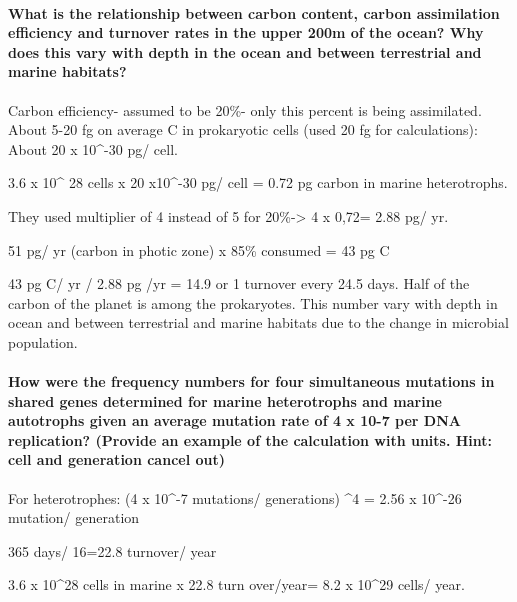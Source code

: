 \documentclass[]{article}
\let\oldparagraph\paragraph
\renewcommand{\paragraph}[1]{\oldparagraph{#1}\mbox{}}
\begin{document}
\paragraph{What is the relationship between carbon content, carbon
assimilation efficiency and turnover rates in the upper 200m of the
ocean? Why does this vary with depth in the ocean and between
terrestrial and marine
habitats?}\label{what-is-the-relationship-between-carbon-content-carbon-assimilation-efficiency-and-turnover-rates-in-the-upper-200m-of-the-ocean-why-does-this-vary-with-depth-in-the-ocean-and-between-terrestrial-and-marine-habitats}

Carbon efficiency- assumed to be 20\%- only this percent is being
assimilated. About 5-20 fg on average C in prokaryotic cells (used 20 fg
for calculations): About 20 x 10\^{}-30 pg/ cell.

3.6 x 10\^{} 28 cells x 20 x10\^{}-30 pg/ cell = 0.72 pg carbon in
marine heterotrophs.

They used multiplier of 4 instead of 5 for 20\%-\textgreater{} 4 x 0,72=
2.88 pg/ yr.

51 pg/ yr (carbon in photic zone) x 85\% consumed = 43 pg C

43 pg C/ yr / 2.88 pg /yr = 14.9 or 1 turnover every 24.5 days. Half of
the carbon of the planet is among the prokaryotes. This number vary with
depth in ocean and between terrestrial and marine habitats due to the
change in microbial population.

\paragraph{How were the frequency numbers for four simultaneous
mutations in shared genes determined for marine heterotrophs and marine
autotrophs given an average mutation rate of 4 x 10-7 per DNA
replication? (Provide an example of the calculation with units. Hint:
cell and generation cancel
out)}\label{how-were-the-frequency-numbers-for-four-simultaneous-mutations-in-shared-genes-determined-for-marine-heterotrophs-and-marine-autotrophs-given-an-average-mutation-rate-of-4-x-10-7-per-dna-replication-provide-an-example-of-the-calculation-with-units.-hint-cell-and-generation-cancel-out}

For heterotrophes: (4 x 10\^{}-7 mutations/ generations) \^{}4 = 2.56 x
10\^{}-26 mutation/ generation

365 days/ 16=22.8 turnover/ year

3.6 x 10\^{}28 cells in marine x 22.8 turn over/year= 8.2 x 10\^{}29
cells/ year.
\end{document}
